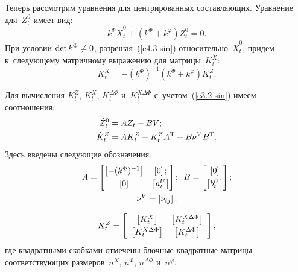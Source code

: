 \begin{multicols}{2}
Теперь рассмотрим уравнения для центрированных со\-став\-ля\-ющих. Уравнение для~$Z_t^0$ имеет вид:
  \begin{equation}
    k^\Phi \dot X_t^0 +(k^\Phi + k^\varphi) Z_t^0=0.
    \label{e4.3-sin}
\end{equation}
При условии $\mathrm{det}\,k^\Phi  \hm\ne 0$, разрешая~(\ref{e4.3-sin}) относительно~$\dot X_t^0$, придем 
к~сле\-ду\-юще\-му мат\-рич\-но\-му выражению для мат\-ри\-цы~$K_t^{\dot X}$:
  \begin{equation}
    K_t^{\dot X}=-\left(k^\Phi\right)^{-1}\left(k^\Phi+k^\varphi\right) K_t^Z.
    \label{e4.4-sin}
    \end{equation}

Для вычисления $K_t^Z$, $K_t^X$, $K_t^{\Delta\Phi}$ и~$K_t^{X\Delta\Phi}$ с~учетом~(\ref{e3.2-sin}) 
имеем соотношения:
\begin{align}
    \dot Z_t^0 &=AZ_t +BV;
\notag\\ %
    \dot K_t^Z&=AK_t^Z+K_t^ZA^{\mathrm{T}}+B\nu^VB^{\mathrm{T}}.
    \label{e4.6-sin}
\end{align}
Здесь введены сле\-ду\-ющие обозначения:
\begin{multline}
    A=\begin{bmatrix}
    \left[ -(k^\Phi)^{-1} \right]& \left[ 0\right];\\[3pt]
    \left[ 0\right] & \left[ a_t^U\right]
    \end{bmatrix}; \enskip
    B=\begin{bmatrix} 
    \left[ 0\right]\\[3pt] 
    \left[ b_t^U\right]
    \end{bmatrix};\\ 
    \nu^V =\left[ \nu_{ij}\right];
    \label{e4.7-sin}
\end{multline}

\noindent
\begin{equation}
K_t^Z = \left[\begin{array}{cc}
    \left[ K_t^X\right]& \left[ K_t^{X\Delta \Phi}\right]\\[3pt]
    \left[ K_t^{X\Delta \Phi}\right]& \left[ K_t^{\Delta \Phi}\right]\\\end{array}\right],
    \label{e4.8-sin}
\end{equation}
где квадратными скобками отмечены блоч\-ные квад\-рат\-ные мат\-ри\-цы со\-от\-вет\-ст\-ву\-ющих 
размеров~$n^X$, $n^\Phi$, $n^{\Delta \Phi}$ и~$n^\varphi$.


\end{multicols}
